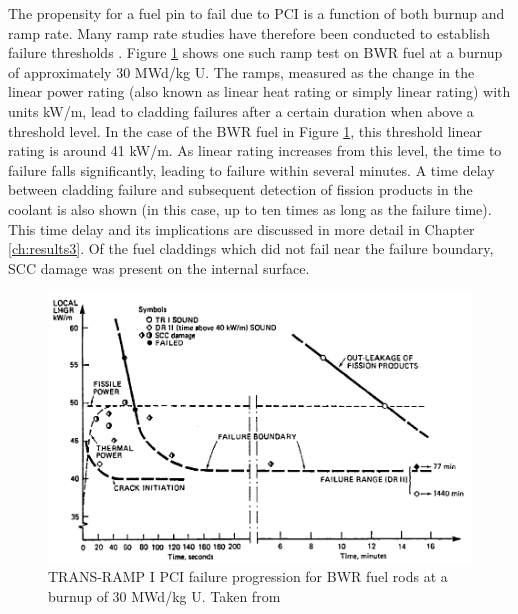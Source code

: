 The propensity for a fuel pin to fail due to PCI is a function of both burnup and ramp rate. Many ramp rate studies have therefore been conducted to establish failure thresholds \cite{Thomas1979, mogard1980studsvik, franklin1985performance, mogard1985international, djurle1984super, howe1991ramp, baba1983power, suzuki1994burnup, wesley1994mark, djurle1983studsvik, hollowell1982international}. Figure \ref{figure:BWRrampthreshold} shows one such ramp test on BWR fuel at a burnup of approximately 30 MWd/kg U. The ramps, measured as the change in the linear power rating (also known as linear heat rating or simply linear rating) with units kW/m, lead to cladding failures after a certain duration when above a threshold level. In the case of the BWR fuel in Figure \ref{figure:BWRrampthreshold}, this threshold linear rating is around 41 kW/m. As linear rating increases from this level, the time to failure falls significantly, leading to failure within several minutes. A time delay between cladding failure and subsequent detection of fission products in the coolant is also shown (in this case, up to ten times as long as the failure time). This time delay and its implications are discussed in more detail in Chapter \ref{ch:results3}. Of the fuel claddings which did not fail near the failure boundary, SCC damage was present on the internal surface. 

\begin{figure}[ht] %
\centering
\includegraphics[width=14.5cm]{images/BWRrampthreshold.png}
\caption[TRANS-RAMP I PCI failure progression for BWR fuel rods at a burnup of 30 MWd/kg U.]{TRANS-RAMP I PCI failure progression for BWR fuel rods at a burnup of 30 MWd/kg U. Taken from \cite{Mogard1988}}
\label{figure:BWRrampthreshold}
\end{figure}

